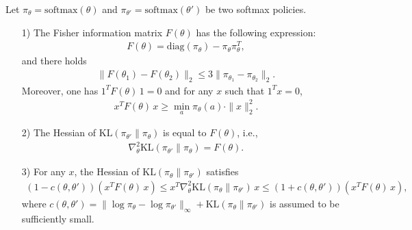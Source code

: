 \begin{lemma}
    Let $\pi_{\theta}=\mathrm{softmax}(\theta)$ and $\pi_{\theta'}=\mathrm{softmax}(\theta')$ be two softmax policies.
    \begin{enumerate}
        \item[\textup{1)}] The Fisher information matrix $F(\theta)$ has the following expression:
        \begin{align*}
            F(\theta) =\mathrm{diag}(\pi_\theta)-\pi_\theta\pi_\theta^T,            
        \end{align*}
        and there holds
        \begin{align*}
            \|F(\theta_1)-F(\theta_2)\|_2\leq 3\|\pi_{\theta_1}-\pi_{\theta_2}\|_2.
        \end{align*}
        Moreover, one has $1^TF(\theta)\,1=0$ and for any $x$ such that $1^Tx=0$,
        \begin{align*}
            x^TF(\theta)\,x\geq \min_a\pi_\theta(a) \cdot \|x\|_2^2.
        \end{align*}
        \item[\textup{2)}] The Hessian of $\mathrm{KL}(\pi_{\theta'}\|\pi_\theta)$ is equal to $F(\theta)$, i.e.,
        \begin{align*}
            \nabla_\theta^2\mathrm{KL}(\pi_{{\theta'}}\|\pi_{{\theta}}) = F(\theta).
        \end{align*}
        \item[\textup{3)}] For any $x$, the Hessian of $\mathrm{KL}(\pi_\theta\|\pi_{\theta'})$ satisfies
        \begin{align*}
            \left(1-c(\theta,\theta')\right)\left(x^TF(\theta)\,x\right)\leq x^T\nabla_\theta^2\mathrm{KL}(\pi_\theta\|\pi_{\theta'})\,x \leq
            \left(1+c(\theta,\theta')\right)\left(x^TF(\theta)\,x\right),
        \end{align*}    
        where $c(\theta,\theta')= \|\log\pi_\theta-\log\pi_{\theta'}\|_\infty+\mathrm{KL}(\pi_\theta\|\pi_{\theta'})$ is assumed to be sufficiently small.
    \end{enumerate}
    \label{lem:Softmax-KL-Hessian}
\end{lemma}

